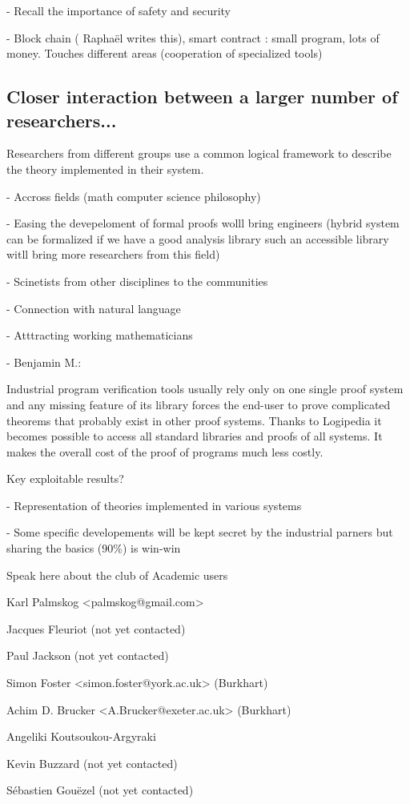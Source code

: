- Recall the importance of safety and security

- Block chain ({\color{red} Raphaël writes this}), smart contract : small program, lots of money. Touches different areas (cooperation of specialized tools)

\subsection{Closer interaction between a larger number of researchers...}


Researchers from different groups use a common logical framework to
describe the theory implemented in their system.

- Accross fields (math computer science philosophy)

- Easing the devepeloment of formal proofs wolll bring engineers
(hybrid system can be formalized if we have a good analysis library
such an accessible library witll bring more researchers from this
field)

- Scinetists from other disciplines to the communities

- Connection with natural language 

- Atttracting working mathematicians

- {\color{red} Benjamin M.}:

Industrial program verification tools usually rely only on one single
proof system and any missing feature of its library forces the
end-user to prove complicated theorems that probably exist in other
proof systems. Thanks to {\sf Logipedia} it becomes possible to access all
standard libraries and proofs of all systems. It makes the overall
cost of the proof of programs much less costly.


{\color{red} Key exploitable results?}

- Representation of theories implemented in various systems

- Some specific developements will be kept secret by the industrial parners
but sharing the basics  (90\%) is win-win

{\color{red} Speak here about the club of Academic users

  
Karl Palmskog <palmskog@gmail.com> 

Jacques Fleuriot (not yet contacted)

Paul Jackson (not yet contacted)

Simon Foster <simon.foster@york.ac.uk> (Burkhart)

Achim D. Brucker <A.Brucker@exeter.ac.uk> (Burkhart)

Angeliki Koutsoukou-Argyraki 

Kevin Buzzard (not yet contacted)

Sébastien Gouëzel (not yet contacted)

}





